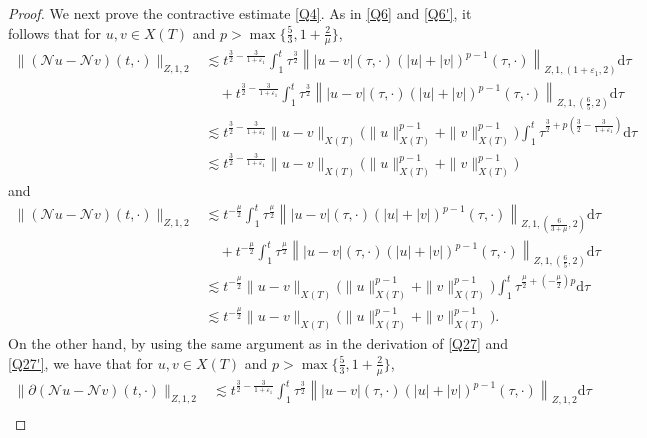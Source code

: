 \documentclass[11pt,twoside]{article}
\newcommand{\p}{\partial}
\newcommand{\ve}{\varepsilon}
\newcommand{\f}{\frac}
\theoremstyle{plain}
\theoremstyle{definition}
\theoremstyle{remark}
\numberwithin{equation}{section}
\begin{document}
\begin{proof}
We next prove the contractive estimate \eqref{Q4}. As  in \eqref{Q6} and \eqref{Q6'}, it follows that for $u, v\in X(T)$ and $p>\max\{\f53, 1+\f{2}{\mu}\}$,
\begin{equation}\label{L20}
\begin{aligned}
\|(\mathcal{N} u-\mathcal{N} v)(t, \cdot)\|_{Z, 1, 2}& \lesssim t^{\f32-\f{3}{1+\ve_1}}\int_{1}^{t} \tau^{\f32}\left\||u-v|(\tau, \cdot)(|u|+|v|)^{p-1}(\tau, \cdot)\right\|_{Z, 1,(1+\varepsilon_1, 2)}\mathrm{d}\tau\\
&\quad+t^{\f32-\f{3}{1+\ve_1}}\int_{1}^{t} \tau^{\f32}\left\||u-v|(\tau, \cdot)(|u|+|v|)^{p-1}(\tau, \cdot)\right\|_{Z, 1,(\f65, 2)}\mathrm{d}\tau\\
&\lesssim t^{\f32-\f{3}{1+\ve_1}} \|u-v\|_{X(T)}\big(\|u\|_{X(T)}^{p-1}+\|v\|_{X(T)}^{p-1}\big)\int_{1}^{t} \tau^{\f32+p(\f32-\f{3}{1+\ve_1})}\mathrm{d}\tau\\
&\lesssim t^{\f32-\f{3}{1+\ve_1}} \|u-v\|_{X(T)}\big(\|u\|_{X(T)}^{p-1}+\|v\|_{X(T)}^{p-1}\big)
\end{aligned}
\end{equation}
and
\begin{equation}\label{L20'}
\begin{aligned}
\|(\mathcal{N} u-\mathcal{N} v)(t, \cdot)\|_{Z, 1, 2}& \lesssim t^{-\f{\mu}{2}}\int_{1}^{t} \tau^{\f{\mu}{2}}\left\||u-v|(\tau, \cdot)(|u|+|v|)^{p-1}(\tau, \cdot)\right\|_{Z, 1,(\f{6}{3+\mu}, 2)}\mathrm{d}\tau\\
&\quad+t^{-\f{\mu}{2}}\int_{1}^{t} \tau^{\f{\mu}{2}}\left\||u-v|(\tau, \cdot)(|u|+|v|)^{p-1}(\tau, \cdot)\right\|_{Z, 1,(\f65, 2)}\mathrm{d}\tau\\
&\lesssim t^{-\f{\mu}{2}} \|u-v\|_{X(T)}\big(\|u\|_{X(T)}^{p-1}+\|v\|_{X(T)}^{p-1}\big)\int_{1}^{t} \tau^{\f{\mu}{2}+(-\f{\mu}{2})p}\mathrm{d}\tau\\
&\lesssim t^{-\f{\mu}{2}} \|u-v\|_{X(T)}\big(\|u\|_{X(T)}^{p-1}+\|v\|_{X(T)}^{p-1}\big).
\end{aligned}
\end{equation}
On the other hand, by using the same argument as in the derivation of \eqref{Q27} and \eqref{Q27'}, we have that for $u, v \in X(T)$ and $p>\max\{\f53, 1+\f{2}{\mu}\}$,
\begin{equation}\label{L21}
\begin{aligned}
\|\p(\mathcal{N} u-\mathcal{N} v)(t, \cdot)\|_{Z, 1, 2}&
\lesssim t^{\f32-\f{3}{1+\ve_1}}\int_{1}^{t} \tau^{\f32}\left\||u-v|(\tau, \cdot)(|u|+|v|)^{p-1}(\tau, \cdot)\right\|_{Z, 1,2}\mathrm{d}\tau\\

\end{aligned}
\end{equation}
\end{proof}
\end{document}
